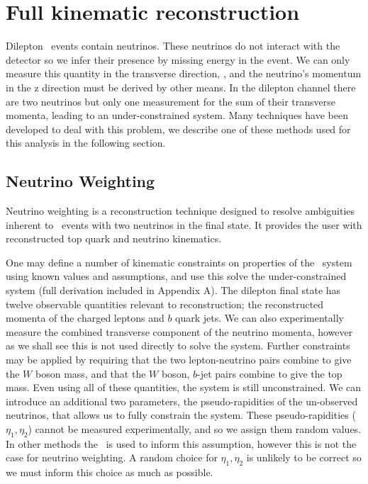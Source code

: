 \clearpage

\section{Full kinematic reconstruction}
Dilepton \ttbar\ events contain neutrinos. These neutrinos do not interact with the detector so we infer their presence by missing energy in the event. We can only measure this quantity in the transverse direction, \etmiss, and the neutrino's momentum in the z direction must be derived by other means. In the dilepton channel there are two neutrinos but only one measurement for the sum of their transverse momenta, leading to an under-constrained system. Many techniques have been developed to deal with this problem, we describe one of these methods used for this analysis in the following section.

\subsection{Neutrino Weighting}

Neutrino weighting is a reconstruction technique designed to resolve ambiguities inherent to \ttbar\ events with two neutrinos in the final state. It provides the user with reconstructed top quark and neutrino kinematics. %

One may define a number of kinematic constraints on properties of the \ttbar\ system using known values and assumptions, and use this solve the under-constrained system (full derivation included in Appendix A). The dilepton final state has twelve observable quantities relevant to reconstruction; the reconstructed momenta of the charged leptons and $b$ quark jets. We can also experimentally measure the combined transverse component of the neutrino momenta, however as we shall see this is not used directly to solve the system. Further constraints may be applied by requiring that the two lepton-neutrino pairs combine to give the $W$ boson mass, and that the $W$ boson, $b$-jet pairs combine to give the top mass. Even using all of these quantities, the system is still unconstrained. We can introduce an additional two parameters, the pseudo-rapidities of the un-observed neutrinos, that allows us to fully constrain the system. These pseudo-rapidities ($\eta_1,\eta_2$) cannot be measured experimentally, and so we assign them random values. In other methods the \etmiss\ is used to inform this assumption, however this is not the case for neutrino weighting. A random choice for $\eta_1,\eta_2$ is unlikely to be correct so we must inform this choice as much as possible.
      
